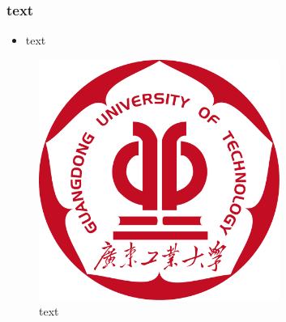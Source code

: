 \subsubsection{text}
\begin{itemize}
    \item text
\end{itemize}
\begin{figure}[h]
    \centering
    \includegraphics[width=0.7\textwidth]{figures/logo.pdf}
    \caption{text}
\end{figure}


